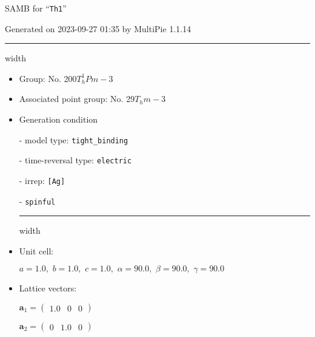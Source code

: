 \documentclass[fleqn,10pt,landscape]{article}
\begin{document}
\setcounter{MaxMatrixCols}{16}

\setlength{\baselineskip}{16pt}
\footnotesize
\begin{center}
\LARGE
SAMB for ``\texttt{Th1}''
\end{center}
\begin{flushright}
Generated on 2023-09-27 01:35 by MultiPie 1.1.14
\end{flushright}
\vspace{1cm}


 \hfil \hrule height 1mm width \textwidth \hfil

\begin{itemize}
\item Group: No. 200\quad$T_{h}^{1}$\quad$Pm-3$\quad[ cubic ]

\item Associated point group: No. 29\quad$T_{h}$\quad$m-3$\quad[ cubic ]

\vspace{5mm}

\item Generation condition

\quad - model type: \texttt{tight_binding}

\quad - time-reversal type: \texttt{electric}

\quad - irrep: \texttt{[Ag]}

\quad - \texttt{spinful}


 \hfil \hrule height 1mm width \textwidth \hfil

\item Unit cell:

\quad $a=1.0,\,\, b=1.0,\,\, c=1.0,\,\, \alpha=90.0,\,\, \beta=90.0,\,\, \gamma=90.0$

\item Lattice vectors:

\quad $\bm{a}_1=\begin{pmatrix} 1.0 & 0 & 0 \end{pmatrix}$

\quad $\bm{a}_2=\begin{pmatrix} 0 & 1.0 & 0 \end{pmatrix}$


\end{itemize}
\end{document}
